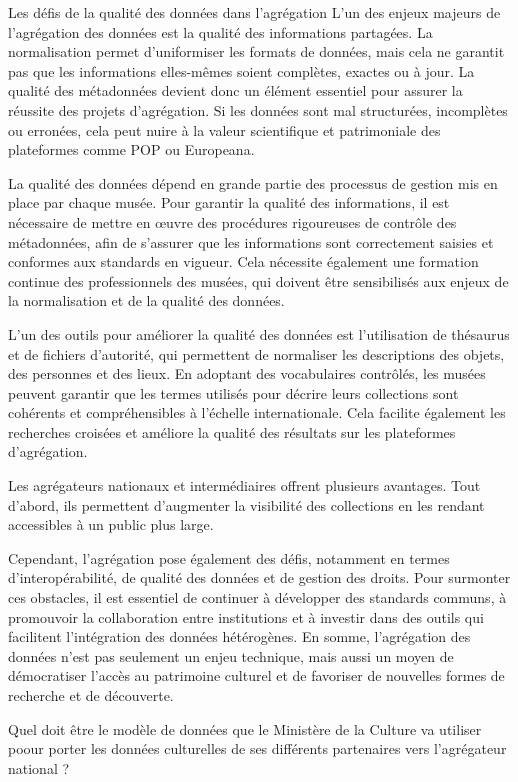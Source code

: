 Les défis de la qualité des données dans l’agrégation
L’un des enjeux majeurs de l’agrégation des données est la qualité des informations partagées. La normalisation permet d’uniformiser les formats de données, mais cela ne garantit pas que les informations elles-mêmes soient complètes, exactes ou à jour. La qualité des métadonnées devient donc un élément essentiel pour assurer la réussite des projets d’agrégation. Si les données sont mal structurées, incomplètes ou erronées, cela peut nuire à la valeur scientifique et patrimoniale des plateformes comme POP ou Europeana. \newline

La qualité des données dépend en grande partie des processus de gestion mis en place par chaque musée. Pour garantir la qualité des informations, il est nécessaire de mettre en œuvre des procédures rigoureuses de contrôle des métadonnées, afin de s'assurer que les informations sont correctement saisies et conformes aux standards en vigueur. Cela nécessite également une formation continue des professionnels des musées, qui doivent être sensibilisés aux enjeux de la normalisation et de la qualité des données. \newline

L'un des outils pour améliorer la qualité des données est l'utilisation de thésaurus et de fichiers d'autorité, qui permettent de normaliser les descriptions des objets, des personnes et des lieux. En adoptant des vocabulaires contrôlés, les musées peuvent garantir que les termes utilisés pour décrire leurs collections sont cohérents et compréhensibles à l’échelle internationale. Cela facilite également les recherches croisées et améliore la qualité des résultats sur les plateformes d’agrégation. \newline

Les agrégateurs nationaux et intermédiaires offrent plusieurs avantages. Tout d'abord, ils permettent d'augmenter la visibilité des collections en les rendant accessibles à un public plus large. \newline

Cependant, l'agrégation pose également des défis, notamment en termes d'interopérabilité, de qualité des données et de gestion des droits. Pour surmonter ces obstacles, il est essentiel de continuer à développer des standards communs, à promouvoir la collaboration entre institutions et à investir dans des outils qui facilitent l'intégration des données hétérogènes.
En somme, l'agrégation des données n'est pas seulement un enjeu technique, mais aussi un moyen de démocratiser l'accès au patrimoine culturel et de favoriser de nouvelles formes de recherche et de découverte.
\newline

Quel doit être le modèle de données que le Ministère de la Culture va  utiliser poour porter les données culturelles de ses différents partenaires vers l'agrégateur national ?

